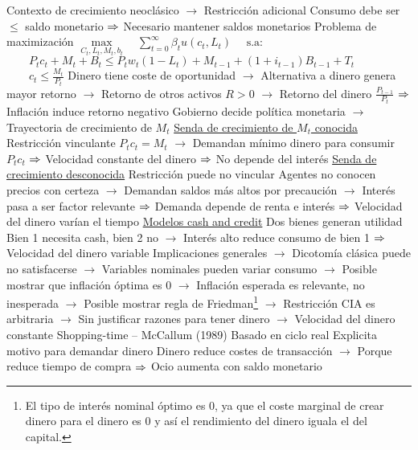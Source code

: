 \documentclass{nuevotema}
\begin{document}
\begin{esquemal}
				\4[] Contexto de crecimiento neoclásico
				\4[] $\to$ Restricción adicional
				\4[] Consumo debe ser $\leq$ saldo monetario
				\4[] 
				\4[] $\Rightarrow$ Necesario mantener saldos monetarios
				\4[] Problema de maximización
				\4[] $\underset{C_t, L_t, M_t, b_t}{\max} \quad \sum_{t=0}^\infty \beta_t u(c_t, L_t)$
				\4[] $\quad \text{s.a:}$
				\4[] $\quad \quad P_t c_t + M_t + B_t \leq P_t w_t (1-L_t) + M_{t-1} + (1+i_{t-1}) B_{t-1} + T_t$
				\4[] $\quad \quad c_t \leq \frac{M_t}{P_t}$
				\4[] Dinero tiene coste de oportunidad
				\4[] $\to$ Alternativa a dinero genera mayor retorno
				\4[] $\to$ Retorno de otros activos $R > 0$
				\4[] $\to$ Retorno del dinero $\frac{P_{t-1}}{P_t}$
				\4[] $\Rightarrow$ Inflación induce retorno negativo
				\4[] Gobierno decide política monetaria
				\4[] $\to$ Trayectoria de crecimiento de $M_t$
				\4[] \underline{Senda de crecimiento de $M_t$ conocida}
				\4[] Restricción vinculante $P_t c_t = M_t$
				\4[] $\to$ Demandan mínimo dinero para consumir $P_t c_t$
				\4[] $\Rightarrow$ Velocidad constante del dinero
				\4[] $\Rightarrow$ No depende del interés
				\4[] \underline{Senda de crecimiento desconocida}
				\4[] Restricción puede no vincular
				\4[] Agentes no conocen precios con certeza
				\4[] $\to$ Demandan saldos más altos por precaución
				\4[] $\to$ Interés pasa a ser factor relevante
				\4[] $\Rightarrow$ Demanda depende de renta e interés
				\4[] $\Rightarrow$ Velocidad del dinero varían el tiempo
				\4[] \underline{Modelos cash and credit}
				\4[] Dos bienes generan utilidad
				\4[] Bien 1 necesita cash, bien 2 no
				\4[] $\to$ Interés alto reduce consumo de bien 1
				\4[] $\Rightarrow$ Velocidad del dinero variable
				\4[] Implicaciones generales
				\4[] $\to$ Dicotomía clásica puede no satisfacerse
				\4[] $\to$ Variables nominales pueden variar consumo
				\4[] $\to$ Posible mostrar que inflación óptima es 0
				\4[] $\to$ Inflación esperada es relevante, no inesperada
				\4[] $\to$ Posible mostrar regla de Friedman\footnote{El tipo de interés nominal óptimo es 0, ya que el coste marginal de crear dinero para el dinero es 0 y así el rendimiento del dinero iguala el del capital.}
				\4[] $\to$ Restricción CIA es arbitraria
				\4[] $\to$ Sin justificar razones para tener dinero
				\4[] $\to$ Velocidad del dinero constante
			\3 Shopping-time -- McCallum (1989)
				\4[] Basado en ciclo real
				\4[] Explicita motivo para demandar dinero
				\4[] Dinero reduce costes de transacción
				\4[] $\to$ Porque reduce tiempo de compra
				\4[] $\Rightarrow$ Ocio aumenta con saldo monetario

\end{esquemal}
\end{document}
